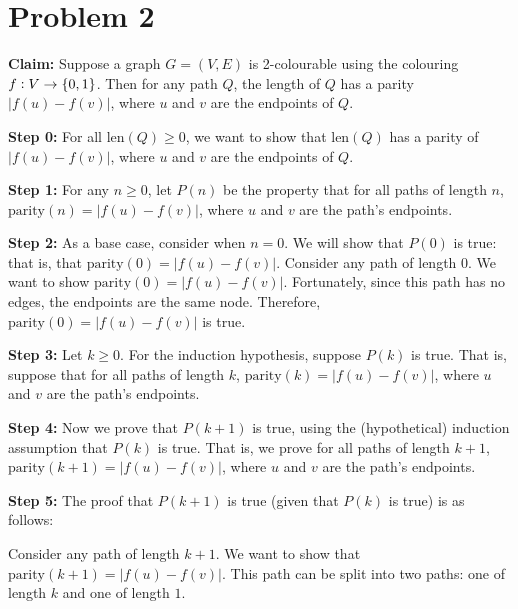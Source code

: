 \documentclass{article}
\begin{document}
\vspace{5pt}


\pagebreak
\section{Problem 2}
\noindent\textbf{Claim:} Suppose a graph $G=(V,E)$ is 2-colourable using the colouring $f\vcentcolon V\rightarrow \{0,1\}$. Then for any path $Q$, the length of $Q$ has a parity $|f(u)-f(v)|$, where $u$ and $v$ are the endpoints of $Q$.

\vspace{15pt}

\noindent\textbf{Step 0:} For all $\text{len}(Q)\geq 0$, we want to show that $\text{len}(Q)$ has a parity of $|f(u)-f(v)|$, where $u$ and $v$ are the endpoints of $Q$.\vspace{10pt}

\noindent\textbf{Step 1:} For any $n\geq 0$, let $P(n)$ be the property that for all paths of length $n$, $\text{parity}(n)=|f(u)-f(v)|$, where $u$ and $v$ are the path's endpoints.\vspace{10pt}

\noindent\textbf{Step 2:} As a base case, consider when $n=0$. We will show that $P(0)$ is true: that is, that $\text{parity}(0)=|f(u)-f(v)|$. Consider any path of length $0$. We want to show $\text{parity}(0)=|f(u)-f(v)|$.  Fortunately, since this path has no edges, the endpoints are the same node. Therefore, $\text{parity}(0)=|f(u)-f(v)|$ is true.\vspace{10pt} 

\noindent\textbf{Step 3:} Let $k \geq 0$. For the induction hypothesis, suppose $P(k)$ is true. That is, suppose that for all paths of length $k$, $\text{parity}(k)=|f(u)-f(v)|$, where $u$ and $v$ are the path's endpoints.\vspace{10pt}

\noindent\textbf{Step 4:} Now we prove that $P(k+1)$ is true, using the (hypothetical) induction assumption that $P(k)$ is true. That is, we prove for all paths of length $k+1$, $\text{parity}(k+1)=|f(u)-f(v)|$, where $u$ and $v$ are the path's endpoints.\vspace{10pt}

\noindent\textbf{Step 5:} The proof that $P(k+1)$ is true (given that $P(k)$ is true) is as follows:\vspace{5pt}

Consider any path of length $k+1$. We want to show that $\text{parity}(k+1)=|f(u)-f(v)|$. This path can be split into two paths: one of length $k$ and one of length $1$.\vspace{5pt}
\end{document}
